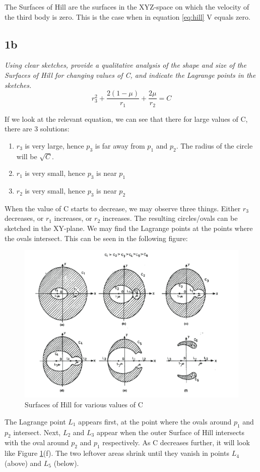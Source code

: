 The Surfaces of Hill are the surfaces in the XYZ-space on which the velocity of the third body is zero. This is the case when in equation \ref{eq:hill} V equals zero.

\subsection{1b}
\textit{Using clear sketches, provide a qualitative analysis of the shape and size of the Surfaces of Hill for changing values of C, and indicate the Lagrange points in the sketches.} \\

\begin{equation}\label{eq:hill2}
    r_3^2+\dfrac {2\left( 1-\mu \right) }{r_{1}}+\dfrac {2\mu }{r_{2}} = C
\end{equation}

If we look at the relevant equation, we can see that there for large values of C, there are 3 solutions:
\begin{enumerate}
    \item $r_3$ is very large, hence $p_3$ is far away from $p_1$ and $p_2$. The radius of the circle will be $\sqrt{C}$.
    \item $r_1$ is very small, hence $p_3$ is near $p_1$
    \item $r_2$ is very small, hence $p_3$ is near $p_2$
\end{enumerate}

When the value of C starts to decrease, we may observe three things. Either $r_3$ decreases, or $r_1$ increases, or $r_2$ increases. The resulting circles/ovals can be sketched in the XY-plane. We may find the Lagrange points at the points where the ovals intersect. This can be seen in the following figure:
\begin{figure}[H]
    \centering
    \includegraphics[width=1\columnwidth]{Figures/1b.png}
    \caption{Surfaces of Hill for various values of C}
    \label{fig:hill}
\end{figure}
The Lagrange point $L_1$ appears first, at the point where the ovals around $p_1$ and $p_2$ intersect. Next, $L_2$ and $L_3$ appear when the outer Surface of Hill intersects with the oval around $p_2$ and $p_1$ respectively. As C decreases further, it will look like Figure \ref{fig:hill}(f). The two leftover areas shrink until they vanish in points $L_4$ (above) and $L_5$ (below).


